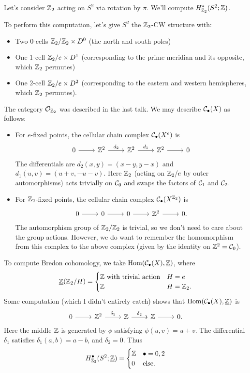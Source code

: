 \documentclass{article}
\begin{document}
\begin{ex}
  Let's consider $\mathbb{Z}_2$ acting on $S^2$ via rotation by $\pi$.
  We'll compute $H^*_{\mathbb{Z}_2}(S^2; \mathbb{Z})$.

  To perform this computation, let's give $S^2$ the $\mathbb{Z}_2$-CW structure with:
  \begin{itemize}
    \item Two $0$-cells $\mathbb{Z}_2 / \mathbb{Z}_2 \times D^0$ (the north and south poles)
    \item One $1$-cell $\mathbb{Z}_2 / e \times D^1$ (corresponding to the prime meridian and its opposite, which $\mathbb{Z}_2$ permutes)
    \item One $2$-cell $\mathbb{Z}_2 / e \times D^2$ (corresponding to the eastern and western hemispheres, which $\mathbb{Z}_2$ permutes).
  \end{itemize}
  The category $\mathcal{O}_{\mathbb{Z}_2}$ was described in the last talk.
  We may describe $\mathcal{C}_\bullet(X)$ as follows:
  \begin{itemize}
    \item For $e$-fixed points, the cellular chain complex $\mathcal{C}_\bullet(X^e)$ is
      \[
        \begin{tikzcd}
          0 \rar & \ZZ^2 \rar["d_2"] & \ZZ^2 \rar["d_1"] & \ZZ^2 \rar & 0
        \end{tikzcd}
      \]
      The differentials are $d_2(x, y) = (x-y, y-x)$ and $d_1(u, v) = (u+v, -u-v)$.
      Here $\mathbb{Z}_2$ (acting on $\mathbb{Z}_2 / e$ by outer automorphisms) acts trivially on $\mathcal{C}_0$ and swaps the factors of $\mathcal{C}_1$ and $\mathcal{C}_2$.
    \item For $\mathbb{Z}_2$-fixed points, the cellular chain complex $\mathcal{C}_\bullet(X^{\mathbb{Z}_2})$ is
      \[
        \begin{tikzcd}
          0 \rar & 0 \rar & 0 \rar & \ZZ^2 \rar & 0.
        \end{tikzcd}
      \]
      The automorphism group of $\mathbb{Z}_2 / \mathbb{Z}_2$ is trivial, so we don't need to care about the group actions.
      However, we do want to remember the homomorphism from this complex to the above complex (given by the identity on $\mathbb{Z}^2 = \mathcal{C}_0$).
  \end{itemize}
  To compute Bredon cohomology, we take $\operatorname{Hom}(\mathcal{C}_\bullet(X), \underline{\mathbb{Z}})$, where
  \[
    \underline{\mathbb{Z}}(\mathbb{Z}_2 / H) = \begin{cases}
      \mathbb{Z} \textrm{ with trivial action} & H = e \\
      \mathbb{Z} & H = \mathbb{Z}_2.
    \end{cases}
  \]
  Some computation (which I didn't entirely catch) shows that $\operatorname{Hom}(\mathcal{C}_\bullet(X), \underline{\mathbb{Z}})$ is
  \[
    \begin{tikzcd}
      0 \rar & \ZZ^2 \rar["\delta_1"] & \ZZ \rar["\delta_2"] \rar & \ZZ \rar & 0.
    \end{tikzcd}
  \]
  Here the middle $\mathbb{Z}$ is generated by $\phi$ satisfying $\phi(u, v) = u + v$.
  The differential $\delta_1$ satisfies $\delta_1(a, b) = a - b$, and $\delta_2 = 0$.
  Thus
  \[
    H^\bullet_{\mathbb{Z}_2}(S^2; \underline{\mathbb{Z}}) = \begin{cases}
      \mathbb{Z} & \bullet = 0, 2 \\
      0 & \textrm{else.}
    \end{cases}
  \]
\end{ex}
\end{document}
